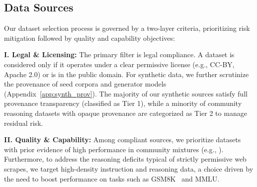 

\subsection{Data Sources}
\label{sec:data_sources}
Our dataset selection process is governed by a two-layer  criteria, prioritizing risk mitigation followed by quality and capability objectives:

\textbf{I. Legal \& Licensing:} The primary filter is legal compliance. A dataset is considered only if it operates under a clear permissive license (e.g., CC-BY, Apache 2.0) or is in the public domain. For synthetic data, we further scrutinize the provenance of seed corpora and generator models (Appendix~\ref{app:synth_prov}). The majority of our synthetic sources satisfy full provenance transparency (classified as Tier 1), while a minority of community reasoning datasets with opaque provenance are categorized as Tier 2 to manage residual risk.

\textbf{II. Quality \& Capability:} Among compliant sources, we prioritize datasets with prior evidence of high performance in community mixtures (e.g., \citealp{peS2o}). Furthermore, to address the reasoning deficits typical of strictly permissive web scrapes, we target high-density instruction and reasoning data, a choice driven by the need to boost performance on tasks such as GSM8K~\citep{cobbe2021training} and MMLU\citep{hendrycks2021mmlu}.


